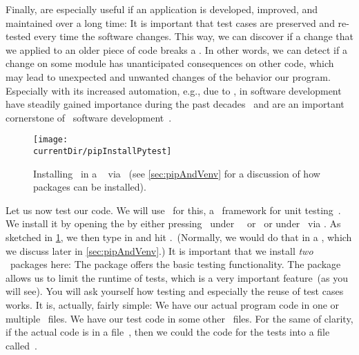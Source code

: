 Finally,  are especially useful if an application is developed, improved, and maintained over a long time:
It is important that test cases are preserved and re-tested every time the software changes.
This way, we can discover if a change that we applied to an older piece of code breaks a .
In other words, we can detect if a change on some module has unanticipated consequences on other code, which may lead to unexpected and unwanted changes of the behavior our program.
Especially with its increased automation, e.g., due to ,  in software development have steadily gained importance during the past decades~\cite{W2000WISTAWIISH,TLG2006UTCU,R2006ASOUTP} and are an important cornerstone of \python\ software development~\cite{P2021PUTAAOAEUTIP,O2022PTWP,DG2020TIP}.%
%
%
\begin{figure}%
\centering%
\texttt{[image: \\currentDir/pipInstallPytest]}%
\caption{Installing \pytest\ in a \ubuntu\  via \pip~(see \cref{sec:pipAndVenv} for a discussion of how packages can be installed).}%
\label{fig:pipInstallPytest}%
\end{figure}%
%
Let us now test our code.
We will use \pytest\ for this, a \python\ framework for unit testing~\cite{KPDT2024PD}.
We install it by opening the  by either pressing \ubuntuTerminal\ under \ubuntu\ \linux\ or \ubuntuTerminal\ or under \microsoftWindows\ via \windowsTerminal.
As sketched in \cref{fig:pipInstallPytest}, we then type in  and hit \keys{\return}.~(Normally, we would do that in a , which we discuss later in \cref{sec:pipAndVenv}.)
It is important that we install \emph{two} \python\ packages here:
The package  offers the basic testing functionality.
The package  allows us to limit the runtime of tests, which is a very important feature~(as you will see).%
%
%
%
You will ask yourself how testing and especially the reuse of test cases works.
It is, actually, fairly simple:
We have our actual program code in one or multiple \python\ files.
We have our test code in some other \python\ files.
For the same of clarity, if the actual code is in a file~, then we could the code for the tests into a file called~.

